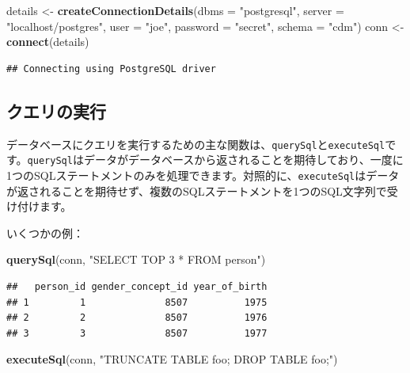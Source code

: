 \documentclass[
  11pt]{book}
\newenvironment{Shaded}{\begin{snugshade}}{\end{snugshade}}
\newcommand{\AttributeTok}[1]{\textcolor[rgb]{0.13,0.29,0.53}{#1}}
\newcommand{\FunctionTok}[1]{\textcolor[rgb]{0.13,0.29,0.53}{\textbf{#1}}}
\newcommand{\NormalTok}[1]{#1}
\newcommand{\OtherTok}[1]{\textcolor[rgb]{0.56,0.35,0.01}{#1}}
\newcommand{\StringTok}[1]{\textcolor[rgb]{0.31,0.60,0.02}{#1}}
\theoremstyle{definition}
\theoremstyle{definition}
\theoremstyle{definition}
\theoremstyle{definition}
\theoremstyle{remark}
\begin{document}
\begin{Shaded}
\begin{Highlighting}[]
\NormalTok{details }\OtherTok{\textless{}{-}} \FunctionTok{createConnectionDetails}\NormalTok{(}\AttributeTok{dbms =} \StringTok{"postgresql"}\NormalTok{,}
                                   \AttributeTok{server =} \StringTok{"localhost/postgres"}\NormalTok{,}
                                   \AttributeTok{user =} \StringTok{"joe"}\NormalTok{,}
                                   \AttributeTok{password =} \StringTok{"secret"}\NormalTok{,}
                                   \AttributeTok{schema =} \StringTok{"cdm"}\NormalTok{)}
\NormalTok{conn }\OtherTok{\textless{}{-}} \FunctionTok{connect}\NormalTok{(details)}
\end{Highlighting}
\end{Shaded}

\begin{verbatim}
## Connecting using PostgreSQL driver
\end{verbatim}

\subsection{クエリの実行}\label{ux30afux30a8ux30eaux306eux5b9fux884c}

データベースにクエリを実行するための主な関数は、\texttt{querySql}と\texttt{executeSql}です。\texttt{querySql}はデータがデータベースから返されることを期待しており、一度に1つのSQLステートメントのみを処理できます。対照的に、\texttt{executeSql}はデータが返されることを期待せず、複数のSQLステートメントを1つのSQL文字列で受け付けます。 

いくつかの例：

\begin{Shaded}
\begin{Highlighting}[]
\FunctionTok{querySql}\NormalTok{(conn, }\StringTok{"SELECT TOP 3 * FROM person"}\NormalTok{)}
\end{Highlighting}
\end{Shaded}

\begin{verbatim}
##   person_id gender_concept_id year_of_birth
## 1         1              8507          1975
## 2         2              8507          1976
## 3         3              8507          1977
\end{verbatim}

\begin{Shaded}
\begin{Highlighting}[]
\FunctionTok{executeSql}\NormalTok{(conn, }\StringTok{"TRUNCATE TABLE foo; DROP TABLE foo;"}\NormalTok{)}
\end{Highlighting}
\end{Shaded}
\end{document}
